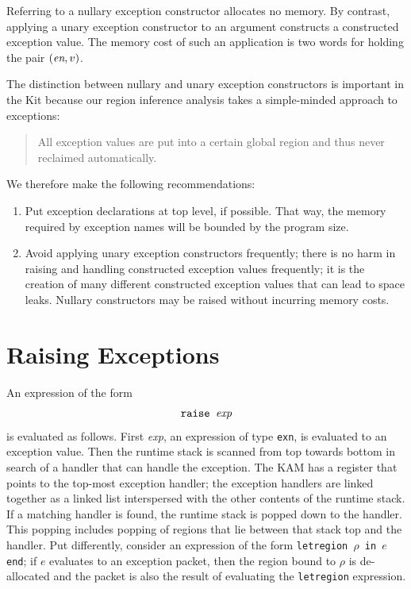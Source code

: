 \documentclass[12pt]{book}
\begin{document}
Referring to a nullary exception constructor allocates no memory. By
contrast, applying a unary exception constructor to an argument
constructs a constructed exception value. The memory cost of such an
application is two words for holding the pair $(\hbox{\it en}, v)$.

The distinction between nullary and unary exception constructors
is important in the Kit because our region inference analysis
takes a simple-minded approach to exceptions: 
\begin{quote}
  All exception values are put into a certain
  global region and thus never reclaimed automatically.
\end{quote}
We therefore make the following recommendations:
\begin{enumerate}
\item Put exception declarations at top level, if possible.
      That way, the memory required by exception names will
       be bounded by the program size.
\item Avoid applying unary exception constructors frequently; there is
      no harm in raising and handling constructed exception values frequently;
      it is the creation of many different constructed exception values
      that can lead to space leaks. Nullary
      constructors may be raised 
          without incurring memory costs.
\end{enumerate}

\section{Raising Exceptions}
An expression of the form 
$$\hbox{\tt raise {\it exp}}$$
is evaluated as follows. First {\it exp}, an expression of 
type {\tt exn}, is evaluated to an exception value. Then the runtime
stack is scanned from top towards bottom in search of a handler
that can handle the exception. The KAM has a register that points
to the top-most exception handler; the exception handlers are linked
together as a linked list interspersed with the other contents of
the runtime stack. If a matching handler is found, the runtime stack
is popped down to the handler. This popping includes popping of regions
that lie between that stack top and the handler. Put differently,
consider an expression of the form 
{\tt letregion $\rho$ in $e$ end}; if $e$ evaluates to an exception packet,
then the region bound to $\rho$ is de-allocated and the packet is also
the result of evaluating the \texttt{letregion} expression.
\end{document}
